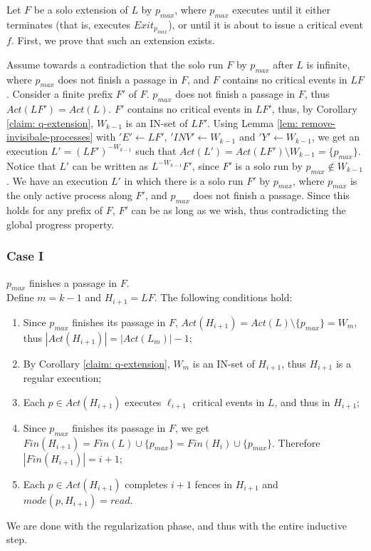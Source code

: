 Let $F$ be a solo extension of $L$ by $p_{max}$, where $p_{max}$ executes until it either terminates (that is, executes $Exit_{p_{max}}$), or until it is about to issue a critical event $f$. First, we prove that such an extension exists.

Assume towards a contradiction that the solo run $F$ by $p_{max}$ after $L$ is infinite, where $p_{max}$ does not finish a passage in $F$, and $F$ contains no critical events in $L F$. Consider a finite prefix $F'$ of $F$. $p_{max}$ does not finish a passage in $F$, thus $Act(L F') = Act(L)$. $F'$ contains no critical events in $L F'$, thus, by Corollary \ref{claim: q-extension}, $W_{k-1}$ is an IN-set of $L F'$. Using Lemma \ref{lem: remove-invisibale-processes} with $'E' \leftarrow L F'$, $'INV' \leftarrow W_{k-1}$ and $'Y' \leftarrow W_{k-1}$, we get an execution $L' = (L F')^{-W_{k-1}}$ such that $Act(L') = Act(L F') \setminus W_{k-1} = \{p_{max}\}$. Notice that $L'$ can be written as $L^{-W_{k-1}} F'$, since $F'$ is a solo run by $p_{max} \notin W_{k-1}$. We have an execution $L'$ in which there is a solo run $F'$ by $p_{max}$, where $p_{max}$ is the only active process along $F'$, and $p_{max}$ does not finish a passage. Since this holds for any prefix of $F$, $F'$ can be as long as we wish, thus contradicting the global progress property.

\subsubsection*{\hspace{5mm} Case I}
$p_{max}$ finishes a passage in $F$.
\\ Define $m = k-1$ and $H_{i+1} = L F$. The following conditions hold:
\begin{enumerate}
	\item Since $p_{max}$ finishes its passage in $F$, $Act(H_{i+1}) = Act(L) \setminus \{p_{max}\} = W_m$, thus $|Act(H_{i+1})| = |Act(L_m)|-1$;
	\item By Corollary \ref{claim: q-extension}, $W_m$ is an IN-set of $H_{i+1}$, thus $H_{i+1}$ is a regular execution;
	\item Each $p \in Act(H_{i+1})$ executes $\ell_{i+1}$ critical events in $L$, and thus in $H_{i+1}$;
	\item Since $p_{max}$ finishes its passage in $F$, we get $Fin(H_{i+1}) = Fin(L) \cup \{p_{max}\} = Fin(H_i) \cup \{p_{max}\}$. Therefore $|Fin(H_{i+1})| = i+1$;
	\item Each $p \in Act(H_{i+1})$ completes $i+1$ fences in $H_{i+1}$ and $mode(p,H_{i+1}) = read$.
\end{enumerate}
We are done with the regularization phase, and thus with the entire inductive step.

